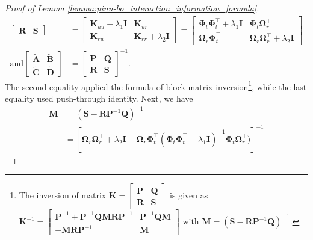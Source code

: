 \begin{proof}[Proof of Lemma \ref{lemma:pinn-bo_interaction_information_formula}]
\begin{align*}
\begin{bmatrix}
            \mathbf{R} & \mathbf{S}
            \end{bmatrix} & = \begin{bmatrix}
            \mathbf{K}_{uu} + \lambda_1\mathbf{I} & \mathbf{K}_{ur}  \\
            \mathbf{K}_{ru}  & \mathbf{K}_{rr} + \lambda_2\mathbf{I}
            \end{bmatrix} = \begin{bmatrix}
            \boldsymbol{\Phi}_t\boldsymbol{\Phi}_t^\top + \lambda_1\mathbf{I} & \boldsymbol{\Phi}_t \boldsymbol{\Omega}_r^\top \\
            \boldsymbol{\Omega}_r\boldsymbol{\Phi}_t^\top & \boldsymbol{\Omega}_r\boldsymbol{\Omega}_r^\top + \lambda_2 \mathbf{I}\end{bmatrix} \\
            \text{and} \begin{bmatrix}
    \widetilde{\mathbf{A}} & \widetilde{\mathbf{B}} 
\\
    \widetilde{\mathbf{C}} & \widetilde{\mathbf{D}} 
        \end{bmatrix} &=\begin{bmatrix}
            \mathbf{P} & \mathbf{Q} \\
            \mathbf{R} & \mathbf{S}
            \end{bmatrix} ^{-1}.
\end{align*}
The second equality applied the formula of block matrix inversion\footnote{The inversion of matrix $\mathbf{K} = \begin{bmatrix}
        \mathbf{P} & \mathbf{Q} \\ \mathbf{R} & \mathbf{S} 
    \end{bmatrix}$ is given as $\mathbf{K}^{-1} = \begin{bmatrix}
        \mathbf{P}^{-1} + \mathbf{P}^{-1} \mathbf{QMR}\mathbf{P}^{-1} & \mathbf{P}^{-1}\mathbf{QM} \\ -\mathbf{MR}\mathbf{P}^{-1} & \mathbf{M} 
    \end{bmatrix}$ with $\mathbf{M} = (\mathbf{S} - \mathbf{R}\mathbf{P}^{-1}\mathbf{Q})^{-1}$.}, 
    while the last equality used push-through identity. Next, we have
\begin{align*}
            \mathbf{M} &= (\mathbf{S} - \mathbf{R}\mathbf{P}^{-1}\mathbf{Q})^{-1} 
\\
            &= \left[\boldsymbol{\Omega}_r \boldsymbol{\Omega}_r^\top  + \lambda_2\mathbf{I} - \boldsymbol{\Omega}_r \boldsymbol{\Phi}_t^\top (\boldsymbol{\Phi}_t \boldsymbol{\Phi}_t ^\top+ \lambda_1\mathbf{I})^{-1} \boldsymbol{\Phi}_t \boldsymbol{\Omega}_r^\top)\right]^{-1} 

\end{align*}
\end{proof}
